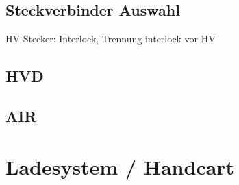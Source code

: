 \subsection{Steckverbinder Auswahl}
HV Stecker: Interlock, Trennung interlock vor HV

\subsection{HVD}

\subsection{AIR}

\section{Ladesystem / Handcart}

